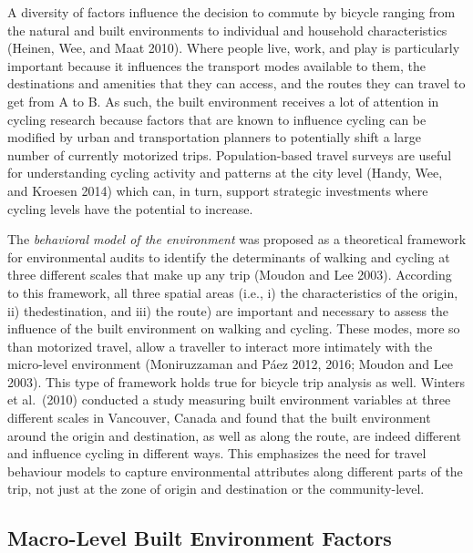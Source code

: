 \documentclass[smallextended]{svjour3}       %
\begin{document}
A diversity of factors influence the decision to commute by bicycle
ranging from the natural and built environments to individual and
household characteristics (Heinen, Wee, and Maat 2010). Where people
live, work, and play is particularly important because it influences the
transport modes available to them, the destinations and amenities that
they can access, and the routes they can travel to get from A to B. As
such, the built environment receives a lot of attention in cycling
research because factors that are known to influence cycling can be
modified by urban and transportation planners to potentially shift a
large number of currently motorized trips. Population-based travel
surveys are useful for understanding cycling activity and patterns at
the city level (Handy, Wee, and Kroesen 2014) which can, in turn,
support strategic investments where cycling levels have the potential to
increase.

The \emph{behavioral model of the environment} was proposed as a
theoretical framework for environmental audits to identify the
determinants of walking and cycling at three different scales that make
up any trip (Moudon and Lee 2003). According to this framework, all
three spatial areas (i.e., i) the characteristics of the origin, ii)
thedestination, and iii) the route) are important and necessary to
assess the influence of the built environment on walking and cycling.
These modes, more so than motorized travel, allow a traveller to
interact more intimately with the micro-level environment (Moniruzzaman
and Páez 2012, 2016; Moudon and Lee 2003). This type of framework holds
true for bicycle trip analysis as well. Winters et al.~(2010) conducted
a study measuring built environment variables at three different scales
in Vancouver, Canada and found that the built environment around the
origin and destination, as well as along the route, are indeed different
and influence cycling in different ways. This emphasizes the need for
travel behaviour models to capture environmental attributes along
different parts of the trip, not just at the zone of origin and
destination or the community-level.

\hypertarget{macro}{%
\subsection{Macro-Level Built Environment Factors}\label{macro}}
\end{document}
